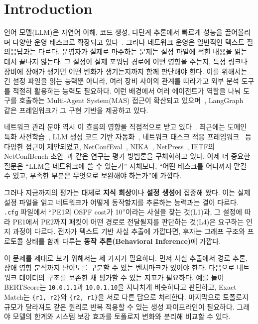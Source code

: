 \documentclass[journal]{IEEEtran}
\begin{document}
\IEEEpeerreviewmaketitle

\section{Introduction}
 언어 모델(LLM)은 자연어 이해, 코드 생성, 다단계 추론에서 빠르게 성능을 끌어올리며 다양한 운영 태스크로 확장되고 있다~\cite{ref1}. 그러나 네트워크 운영은 일반적인 텍스트 질의응답과는 다르다. 운영자가 실제로 마주하는 문제는 설정 파일에 적힌 내용을 읽는 데서 끝나지 않는다. 그 설정이 실제 포워딩 경로에 어떤 영향을 주는지, 특정 링크나 장비에 장애가 생기면 어떤 변화가 생기는지까지 함께 판단해야 한다. 이를 위해서는 긴 설정 파일을 읽는 능력뿐 아니라, 여러 장비 사이의 관계를 따라가고 외부 분석 도구를 적절히 활용하는 능력도 필요하다. 이런 배경에서 여러 에이전트가 역할을 나눠 도구를 호출하는 Multi-Agent System(MAS) 접근이 확산되고 있으며~\cite{ref2}, LangGraph~\cite{ref3} 같은 프레임워크가 그 구현 기반을 제공하고 있다.

네트워크 관리 분야 역시 이 흐름의 영향을 직접적으로 받고 있다~\cite{ref4, ref27}. 최근에는 도메인 특화 사전학습~\cite{ref18}, LLM 생성 코드 기반 자동화~\cite{ref19}, 네트워크 태스크 적응 프레임워크~\cite{ref31} 등 다양한 접근이 제안되었고, NetConfEval~\cite{ref5}, NIKA~\cite{ref6}, NetPress~\cite{ref7}, IETF의 NetConfBench 초안~\cite{ref8}과 같은 연구는 평가 방법론을 구체화하고 있다. 이제 더 중요한 질문은 ``LLM을 네트워크에 쓸 수 있는가'' 자체보다, ``어떤 태스크를 어디까지 맡길 수 있고, 부족한 부분은 무엇으로 보완해야 하는가''에 가깝다.

그러나 지금까지의 평가는 대체로 \textbf{지식 회상}이나 \textbf{설정 생성}에 집중해 왔다. 이는 실제 설정 파일을 읽고 네트워크가 어떻게 동작할지를 추론하는 능력과는 결이 다르다. \texttt{.cfg} 파일에서 ``PE1의 OSPF cost가 10''이라는 사실을 찾는 것(L1)과, 그 설정에 따라 PE1에서 PE2까지 패킷이 어떤 경로로 전달될지를 판단하는 것(L4)은 요구하는 인지 과정이 다르다. 전자가 텍스트 기반 사실 추출에 가깝다면, 후자는 그래프 구조와 프로토콜 상태를 함께 다루는 \textbf{동작 추론(Behavioral Inference)}에 가깝다.

이 문제를 제대로 보기 위해서는 세 가지가 필요하다. 먼저 사실 추출에서 경로 추론, 장애 영향 분석까지 난이도를 구분할 수 있는 벤치마크가 있어야 한다. 다음으로 네트워크 데이터의 구조를 보존한 채 평가할 수 있는 지표가 필요하다. 예를 들어 BERTScore는 \texttt{10.0.1.1}과 \texttt{10.0.1.10}을 지나치게 비슷하다고 판단하고, Exact Match는 \texttt{\{r1, r2\}}와 \texttt{\{r2, r1\}}을 서로 다른 답으로 처리한다. 마지막으로 토폴로지 규모가 달라져도 같은 원리로 반복 적용할 수 있는 생성 파이프라인이 필요하다. 그래야 모델의 한계와 시스템 보강 효과를 토폴로지 변화와 분리해 비교할 수 있다.
\end{document}
